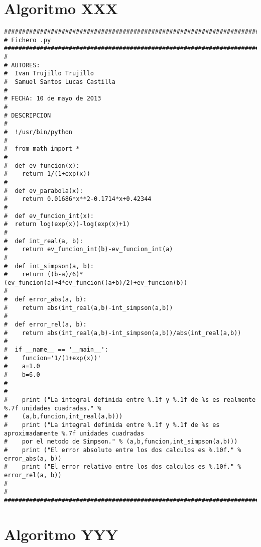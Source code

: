 \section{Algoritmo XXX}
\label{Apendice1:XXX}

\begin{center}
\begin{footnotesize}
\begin{verbatim}
###################################################################################
# Fichero .py
###################################################################################
#
# AUTORES:
#  Ivan Trujillo Trujillo
#  Samuel Santos Lucas Castilla
#   
# FECHA: 10 de mayo de 2013
#
# DESCRIPCION
#   
#  !/usr/bin/python
#
#  from math import *
#
#  def ev_funcion(x):
#    return 1/(1+exp(x))
#
#  def ev_parabola(x):
#    return 0.01686*x**2-0.1714*x+0.42344
#
#  def ev_funcion_int(x):
#  return log(exp(x))-log(exp(x)+1)
# 
#  def int_real(a, b):
#    return ev_funcion_int(b)-ev_funcion_int(a)
#
#  def int_simpson(a, b):
#    return ((b-a)/6)*(ev_funcion(a)+4*ev_funcion((a+b)/2)+ev_funcion(b))
#  
#  def error_abs(a, b):
#    return abs(int_real(a,b)-int_simpson(a,b))
#  
#  def error_rel(a, b):
#    return abs(int_real(a,b)-int_simpson(a,b))/abs(int_real(a,b))
#  
#  if __name__ == '__main__':
#    funcion='1/(1+exp(x))'
#    a=1.0
#    b=6.0
#
# 
#    print ("La integral definida entre %.1f y %.1f de %s es realmente %.7f unidades cuadradas." % 
#    (a,b,funcion,int_real(a,b)))
#    print ("La integral definida entre %.1f y %.1f de %s es aproximadamente %.7f unidades cuadradas
#    por el metodo de Simpson." % (a,b,funcion,int_simpson(a,b)))
#    print ("El error absoluto entre los dos calculos es %.10f." % error_abs(a, b))
#    print ("El error relativo entre los dos calculos es %.10f." % error_rel(a, b))
#
#
###################################################################################
\end{verbatim}
\end{footnotesize}
\end{center}

\section{Algoritmo YYY}
\label{Apendice1:YYY}

